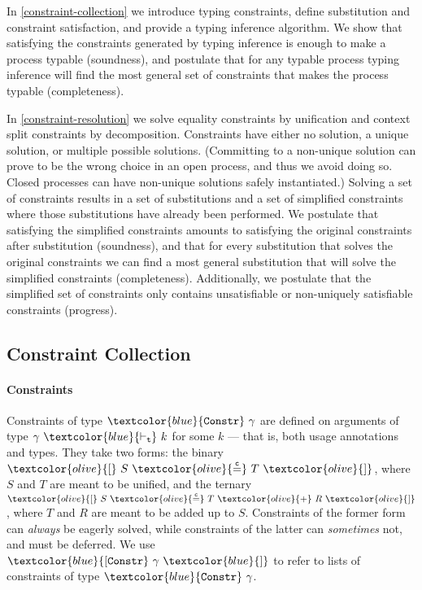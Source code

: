\documentclass[sigplan,screen,review]{acmart}
\newcommand{\constr}[1]{\textcolor{olive}{\mathtt{#1}}}
\newcommand{\type}[1]{\textcolor{blue}{\mathtt{#1}}}
\newcommand{\tkind}[2]{#1 ~\type{\vdash_t}~ #2}
\newcommand{\tConstr}[1]{\type{Constr} ~ #1}
\newcommand{\tConstrs}[1]{\type{[Constr} ~ #1 ~ \type{]}}
\newcommand{\eqconstr}[2]{\constr{[} ~ #1 ~ \constr{\stackrel{c}{=}} ~ #2 ~ \constr{]}}
\newcommand{\sumconstr}[3]{\constr{[} ~ #1 ~ \constr{\stackrel{c}{=}} ~ #2 ~ \constr{+} ~ #3 ~ \constr{]}}
\begin{document}
In \autoref{constraint-collection} we introduce typing constraints, define substitution and constraint satisfaction, and provide a typing inference algorithm.
We show that satisfying the constraints generated by typing inference is enough to make a process typable (soundness), and postulate that for any typable process typing inference will find the most general set of constraints that makes the process typable (completeness).

In \autoref{constraint-resolution} we solve equality constraints by unification and context split constraints by decomposition.
Constraints have either no solution, a unique solution, or multiple possible solutions.
(Committing to a non-unique solution can prove to be the wrong choice in an open process, and thus we avoid doing so.
Closed processes can have non-unique solutions safely instantiated.)
Solving a set of constraints results in a set of substitutions and a set of simplified constraints where those substitutions have already been performed.
We postulate that satisfying the simplified constraints amounts to satisfying the original constraints after substitution (soundness), and that for every substitution that solves the original constraints we can find a most general substitution that will solve the simplified constraints (completeness).
Additionally, we postulate that the simplified set of constraints only contains unsatisfiable or non-uniquely satisfiable constraints (progress).

\subsection{Constraint Collection}
\label{constraint-collection}

\paragraph{Constraints}

Constraints of type $\tConstr{\gamma}$ are defined on arguments of type $\tkind{\gamma}{k}$ for some $k$ --- that is, both usage annotations and types.
They take two forms: the binary $\eqconstr{S}{T}$, where $S$ and $T$ are meant to be unified, and the ternary $\sumconstr{S}{T}{R}$, where $T$ and $R$ are meant to be added up to $S$.
Constraints of the former form can \emph{always} be eagerly solved, while constraints of the latter can \emph{sometimes} not, and must be deferred.
We use $\tConstrs{\gamma}$ to refer to lists of constraints of type $\tConstr{\gamma}$.
\end{document}
